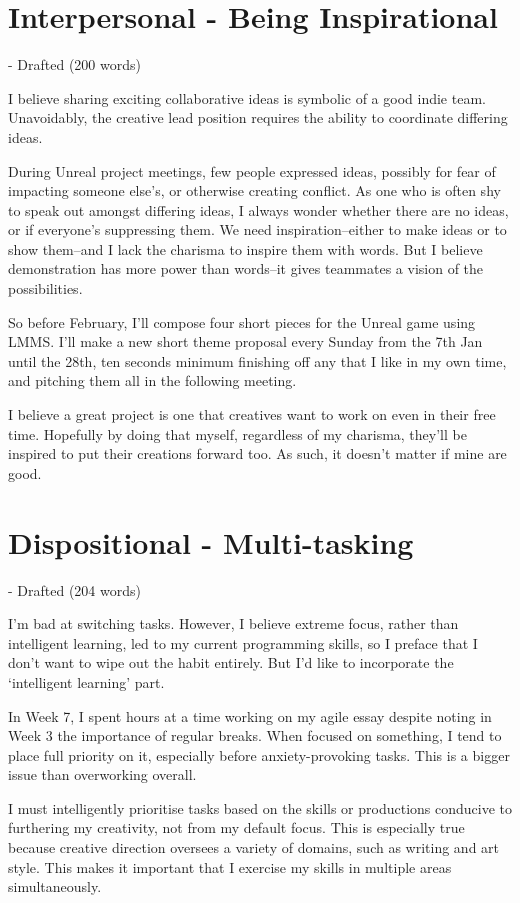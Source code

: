 \documentclass{scrartcl}
\begin{document}
\section{Interpersonal - Being Inspirational} - Drafted (200 words)

I believe sharing exciting collaborative ideas is symbolic of a good indie team. Unavoidably, the creative lead position requires the ability to coordinate differing ideas.

During Unreal project meetings, few people expressed ideas, possibly for fear of impacting someone else's, or otherwise creating conflict. As one who is often shy to speak out amongst differing ideas, I always wonder whether there are no ideas, or if everyone's suppressing them. We need inspiration--either to make ideas or to show them--and I lack the charisma to inspire them with words. But I believe demonstration has more power than words--it gives teammates a vision of the possibilities.

So before February, I'll compose four short pieces for the Unreal game using LMMS. I'll make a new short theme proposal every Sunday from the 7th Jan until the 28th, ten seconds minimum finishing off any that I like in my own time, and pitching them all in the following meeting.

I believe a great project is one that creatives want to work on even in their free time. Hopefully by doing that myself, regardless of my charisma, they'll be inspired to put their creations forward too. As such, it doesn't matter if mine are good.

\section{Dispositional - Multi-tasking} - Drafted (204 words)

I'm bad at switching tasks. However, I believe extreme focus, rather than intelligent learning, led to my current programming skills, so I preface that I don't want to wipe out the habit entirely. But I'd like to incorporate the `intelligent learning' part.

In Week 7, I spent hours at a time working on my agile essay despite noting in Week 3 the importance of regular breaks. When focused on something, I tend to place full priority on it, especially before anxiety-provoking tasks. This is a bigger issue than overworking overall.

I must intelligently prioritise tasks based on the skills or productions conducive to furthering my creativity, not from my default focus. This is especially true because creative direction oversees a variety of domains, such as writing and art style. This makes it important that I exercise my skills in multiple areas simultaneously.
\end{document}
